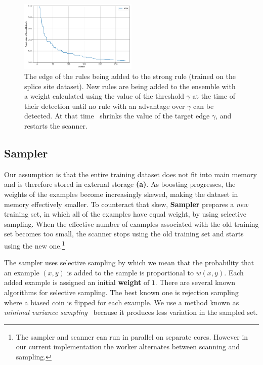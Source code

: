 \begin{figure}
\centering
    \includegraphics[width=0.5\textwidth]{figs/edge.png}
    \caption{The edge of the rules being added to the strong rule
    (trained on the splice site dataset).
    New rules are being added to the ensemble with a weight calculated
    using the value of the threshold $\gamma$ at the time of their
    detection until no rule with an advantage over $\gamma$ can be detected.
    At that time \Sparrow\ shrinks the value of the target edge $\gamma$,
    and restarts the scanner.\label{fig:edge}}
    \vspace{0pt}
\end{figure}

\subsection*{Sampler}

Our assumption is that the entire training dataset does
not fit into main memory and is therefore stored in external storage
{\bf (a)}. As boosting progresses, the weights of the examples become
increasingly skewed, making the dataset in memory effectively smaller.
To counteract that skew, {\bf Sampler} prepares a {\em new}
training set, in which all of the examples have equal weight, by using
selective sampling. When the effective number of examples associated
with the old training set becomes too small, the scanner stops using
the old training set and starts using the new one.\footnote{The
  sampler and scanner can run in parallel on separate cores. However in
  our current implementation the worker alternates between scanning and
  sampling.}

The sampler uses selective sampling by which we mean that the
probability that an example $(x,y)$ is added to the sample is
proportional to $w(x,y)$. Each added example is assigned an initial
{\bf weight} of $1$.
{There are several known algorithms
  for selective sampling. The best known one is rejection sampling
  where a biased coin is flipped for each example. We use a method
  known as \textit{minimal variance sampling}~\cite{kitagawa_monte_1996}
  because it produces less variation in the sampled set.}
  
